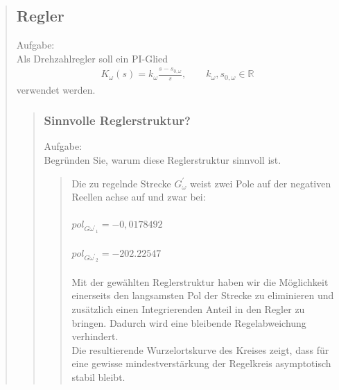 \begin{quote}
\begin{quote}
        
	\end{quote}
	
	\subsection{Regler}
    Aufgabe:\\
    Als Drehzahlregler soll ein PI-Glied\\
    \begin{equation*}
        \begin{split}
            K_\omega (s) = k_\omega \frac{s-s_{0,\omega}}{s}, \hspace{2em} k_\omega, s_{0,\omega} \in \mathbb{R}
        \end{split}
    \end{equation*}
    verwendet werden.
	\begin{quote}
		
		\subsubsection{Sinnvolle Reglerstruktur?}
        Aufgabe:\\
        Begründen Sie, warum diese Reglerstruktur sinnvoll ist.\\
		\begin{quote}
			Die zu regelnde Strecke $G_\omega^{'}$ weist zwei Pole auf der negativen Reellen achse auf und zwar bei:\\
            \\
			$pol_{G\omega^{'}}_1 = - 0,0178492$\\
			\\
			$pol_{G\omega^{'}}_2 = - 202.22547$\\
			\\
			Mit der gewählten Reglerstruktur haben wir die Möglichkeit einerseits den langsamsten Pol der Strecke zu eliminieren
			und zusätzlich einen Integrierenden Anteil in den Regler zu bringen. Dadurch wird eine bleibende Regelabweichung
			verhindert.\\
			Die resultierende Wurzelortskurve des Kreises zeigt, dass für eine gewisse mindestverstärkung der Regelkreis
			asymptotisch stabil bleibt.
		\end{quote}
		

\end{quote}
\end{quote}
